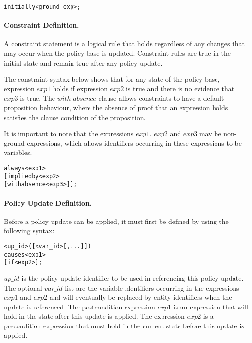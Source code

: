 \documentclass[global,twocolumn,final]{svjour}
\newenvironment{vverbatim}
  {\begin{alltt}}
  {\vspace{-\baselineskip}\end{alltt}}
\begin{document}
          \begin{vverbatim}
  initially <ground-exp>;
          \end{vverbatim}

        \paragraph{Constraint Definition.}

          A constraint statement is a logical rule that holds regardless of any
          changes that may occur when the policy base is updated. Constraint
          rules are true in the initial state and remain true after any policy
          update.

          The constraint syntax below shows that for any state of the policy
          base, expression $exp1$ holds if expression $exp2$ is true and there
          is no evidence that $exp3$ is true. The $with$ $absence$ clause
          allows constraints to have a default proposition behaviour, where
          the absence of proof that an expression holds  satisfies the clause
          condition of the proposition.

          It is important to note that the expressions $exp1$, $exp2$ and
          $exp3$ may be non-ground expressions, which allows identifiers
          occurring in these expressions to be variables.

          \begin{vverbatim}
  always <exp1>
    [implied by <exp2>
    [with absence <exp3>]];
          \end{vverbatim}

        \paragraph{Policy Update Definition.}

          Before a policy update can be applied, it must first be defined by
          using the following syntax:

          \begin{vverbatim}
  <up\_id>([<var\_id>[, ...]])
    causes <exp1>
    [if <exp2>];
          \end{vverbatim}

          $up\_id$ is the policy update identifier to be used in referencing
          this policy update. The optional $var\_id$ list are the variable
          identifiers occurring in the expressions $exp1$ and $exp2$ and will
          eventually be replaced by entity identifiers when the update is
          referenced. The postcondition expression $exp1$ is an expression that
          will hold in the state after this update is applied. The expression
          $exp2$ is a precondition expression that must hold in the current
          state before this update is applied.
\end{document}
